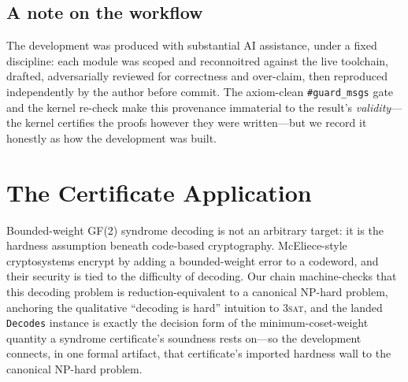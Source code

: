 \documentclass[sigplan,review,anonymous]{acmart}
\begin{document}
\subsection{A note on the workflow}\label{sec:workflow}

The development was produced with substantial AI assistance, under a fixed discipline: each module was scoped
and reconnoitred against the live toolchain, drafted, adversarially reviewed for correctness and over-claim,
then reproduced independently by the author before commit. The axiom-clean \lstinline{#guard_msgs} gate and the
kernel re-check make this provenance immaterial to the result's \emph{validity}---the kernel certifies the
proofs however they were written---but we record it honestly as how the development was built.

\section{The Certificate Application}\label{sec:app}

Bounded-weight GF(2) syndrome decoding is not an arbitrary target: it is the hardness assumption beneath
code-based cryptography. McEliece-style cryptosystems encrypt by adding a bounded-weight error to a codeword,
and their security is tied to the difficulty of decoding. Our chain machine-checks that this decoding problem is
reduction-equivalent to a canonical NP-hard problem, anchoring the qualitative ``decoding is hard'' intuition to
\textsc{3sat}, and the landed \lstinline{Decodes} instance is exactly the decision form of the
minimum-coset-weight quantity a syndrome certificate's soundness rests on---so the development connects, in one
formal artifact, that certificate's imported hardness wall to the canonical NP-hard problem.
\end{document}
